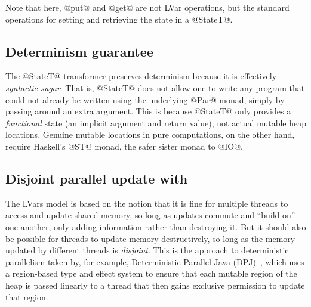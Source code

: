 
Note that here, @put@ and @get@ are not LVar operations, but the
standard operations for setting and retrieving the state in a
@StateT@.

\subsection{Determinism guarantee}

The @StateT@ transformer preserves determinism because it is
effectively \emph{syntactic sugar}.  That is, @StateT@ does not allow
one to write any program that could not already be written using the
underlying @Par@ monad, simply by passing around an extra argument.
This is because @StateT@ only provides a \emph{functional} state (an
implicit argument and return value), not actual mutable heap
locations.  Genuine mutable locations in pure computations, on the
other hand, require Haskell's @ST@ monad, the safer sister monad to
@IO@.

\subsection{Disjoint parallel update with }

The LVars model is based on the notion that it is fine for multiple
threads to access and update shared memory, so long as updates commute
and ``build on'' one another, only adding information rather than
destroying it.  But it should also be possible for threads to update
memory destructively, so long as the memory updated by different
threads is \emph{disjoint}.  This is the approach to deterministic
parallelism taken by, for example, Deterministic Parallel Java
(DPJ)~\cite{dpj-oopsla}, which uses a region-based type and effect
system to ensure that each mutable region of the heap is passed
linearly to a thread that then gains exclusive permission to update
that region.

